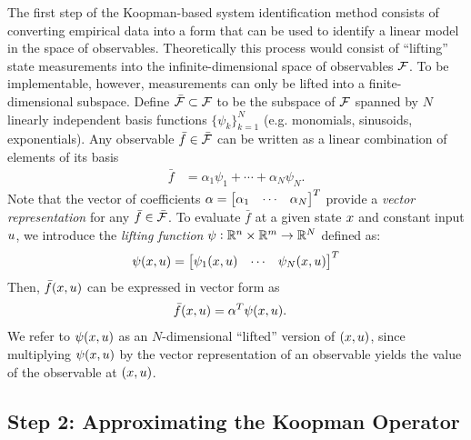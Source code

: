 The first step of the Koopman-based system identification method consists of converting empirical data into a form that can be used to identify a linear model in the space of observables.
Theoretically this process would consist of ``lifting'' state measurements into the infinite-dimensional space of observables $\mathcal{F}$.
To be implementable, however, measurements can only be lifted into a finite-dimensional subspace.
Define $\bar{\mathcal{F}} \subset \mathcal{F}$ to be the subspace of $\mathcal{F}$ spanned by $N$ linearly independent basis functions $\{ \psi_k \}_{k=1}^N$ 
(e.g. monomials, sinusoids, exponentials).
%
Any observable ${\bar{f} \in \bar{\mathcal{F}}}$ can be written as a linear combination of elements of its basis
\begin{align}
    \bar{f} &= \alpha_1 \psi_{1} + \cdots + \alpha_N \psi_N.
\end{align}
Note that the vector of coefficients ${\alpha = \begin{bmatrix} \alpha_1 & \cdots & \alpha_N \end{bmatrix}^T}$ provide a \emph{vector representation} for any $\bar{f} \in \bar{\mathcal{F}}$.
To evaluate $\bar{f}$ at a given state $x$ and constant input $u$, we introduce the \emph{lifting function} ${\psi}:\mathbb{R}^n \times \mathbb{R}^m \to \mathbb{R}^N$ defined as:
\begin{align}
    {\psi}(x, u) = \begin{bmatrix}  \psi_1(x, u) & \cdots & \psi_N(x, u) \end{bmatrix}^T
    \label{eq:lift}
\end{align}
Then, $\bar{f}(x, u)$ can be expressed in vector form as
\begin{align}
    \bar{f}(x, u) &= {\alpha}^T {\psi}(x, u).
    \label{eq:fxu}
\end{align}
We refer to ${\psi}(x, u)$ as an $N$-dimensional ``lifted'' version of ${(x, u)}$, since multiplying ${\psi}(x, u)$ by the vector representation of an observable yields the value of the observable at $(x, u)$.



\subsection{Step 2: Approximating the Koopman Operator} \label{sec:step2}

